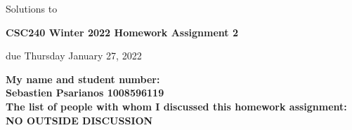\documentclass[11pt]{article}
\begin{document}
\begin{center}
\begin{solution}
Solutions to
\end{solution}
{\bf \Large \bf CSC240 Winter 2022 Homework Assignment 2}\\
\begin{question}
due Thursday January 27, 2022
\end{question}
\end{center}
\begin{solution}
\noindent
{\bf
My name and student number:
\\
Sebastien Psarianos 1008596119}
\\
\medskip
\noindent
{\bf The list of people with whom I discussed this homework assignment: \\NO OUTSIDE DISCUSSION }\\
\end{solution}
\end{document}
